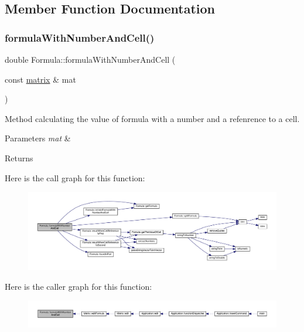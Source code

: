 \subsection{Member Function Documentation}
\mbox{\label{class_formula_a0f831b2ee98fbeb7df371f83ee7d374d}} 
\subsubsection{\texorpdfstring{formula\+With\+Number\+And\+Cell()}{formulaWithNumberAndCell()}}
{\footnotesize\ttfamily double Formula\+::formula\+With\+Number\+And\+Cell (\begin{DoxyParamCaption}\item[{const \hyperlink{formula_8h_a869e2a5deeb3daa4c82d6bc91cf20d92}{matrix} \&}]{mat }\end{DoxyParamCaption})}

Method calculating the value of formula with a number and a refenrence to a cell. 
\begin{DoxyParams}{Parameters}
{\em mat} & \\
\hline
\end{DoxyParams}
\begin{DoxyReturn}{Returns}

\end{DoxyReturn}
Here is the call graph for this function\+:\nopagebreak
\begin{figure}[H]
\begin{center}
\leavevmode
\includegraphics[width=350pt]{class_formula_a0f831b2ee98fbeb7df371f83ee7d374d_cgraph}
\end{center}
\end{figure}
Here is the caller graph for this function\+:\nopagebreak
\begin{figure}[H]
\begin{center}
\leavevmode
\includegraphics[width=350pt]{class_formula_a0f831b2ee98fbeb7df371f83ee7d374d_icgraph}
\end{center}
\end{figure}
\mbox{\label{class_formula_a518bc97bd50f1cc5573be7d3f8cb6253}} 
